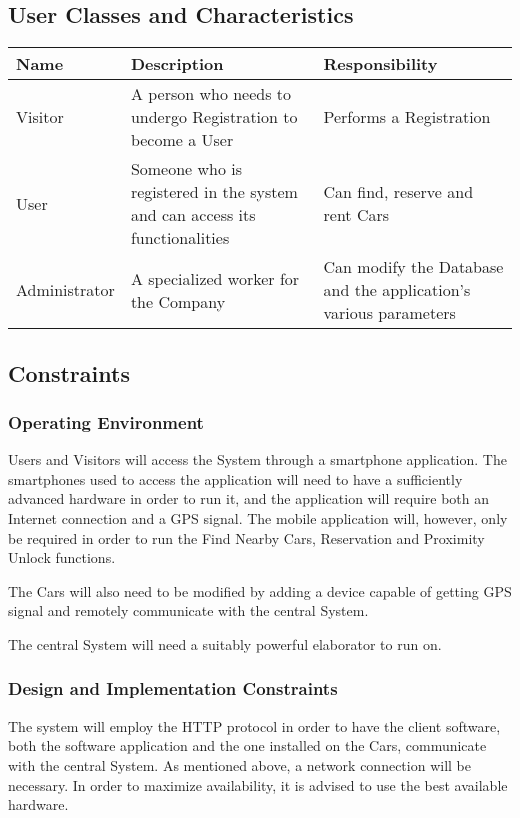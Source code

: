 \subsection{User Classes and Characteristics}
\begin{center}
  \begin{tabular}{|p{}|p{}|p{}|}
    \hline
    \textbf{Name} & \textbf{Description} & \textbf{Responsibility} \\ \hline
    Visitor & A person who needs to undergo Registration to become a User & Performs a Registration \\ \hline
    User & Someone who is registered in the system and can access its functionalities & Can find, reserve and rent Cars \\ \hline
    Administrator & A specialized worker for the Company & Can modify the Database and the application's various parameters \\ \hline
  \end{tabular}
\end{center}

\subsection{Constraints}
\subsubsection{Operating Environment}\label{OE}
Users and Visitors will access the System through a smartphone application. The smartphones used to access the application will need to have a sufficiently advanced hardware in order to run it, and the application will require both an Internet connection and a GPS signal. The mobile application will, however, only be required in order to run the Find Nearby Cars, Reservation and Proximity Unlock functions.

The Cars will also need to be modified by adding a device capable of getting GPS signal and remotely communicate with the central System.

The central System will need a suitably powerful elaborator to run on.

\subsubsection{Design and Implementation Constraints}
The system will employ the HTTP protocol in order to have the client software, both the software application and the one installed on the Cars, communicate with the central System. As mentioned above, a network connection will be necessary. In order to maximize availability, it is advised to use the best available hardware.

